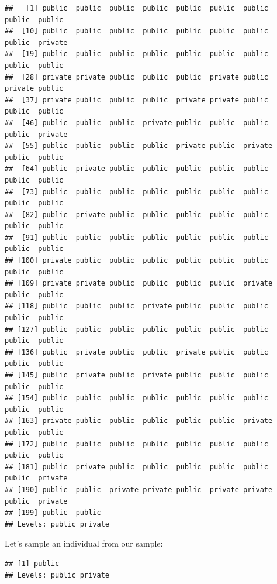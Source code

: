 \documentclass[
]{book}
\newenvironment{Shaded}{\begin{snugshade}}{\end{snugshade}}
\newcommand{\AttributeTok}[1]{\textcolor[rgb]{0.77,0.63,0.00}{#1}}
\newcommand{\DecValTok}[1]{\textcolor[rgb]{0.00,0.00,0.81}{#1}}
\newcommand{\FunctionTok}[1]{\textcolor[rgb]{0.00,0.00,0.00}{#1}}
\newcommand{\NormalTok}[1]{#1}
\newcommand{\SpecialCharTok}[1]{\textcolor[rgb]{0.00,0.00,0.00}{#1}}
\begin{document}
\begin{verbatim}
##   [1] public  public  public  public  public  public  public  public  public 
##  [10] public  public  public  public  public  public  public  public  private
##  [19] public  public  public  public  public  public  public  public  public 
##  [28] private private public  public  public  private public  private public 
##  [37] private public  public  public  private private public  public  public 
##  [46] public  public  public  private public  public  public  public  private
##  [55] public  public  public  public  private public  private public  public 
##  [64] public  private public  public  public  public  public  public  public 
##  [73] public  public  public  public  public  public  public  public  public 
##  [82] public  private public  public  public  public  public  public  public 
##  [91] public  public  public  public  public  public  public  public  public 
## [100] private public  public  public  public  public  public  public  public 
## [109] private private public  public  public  public  private public  public 
## [118] public  public  public  private public  public  public  public  public 
## [127] public  public  public  public  public  public  public  public  public 
## [136] public  private public  public  private public  public  public  public 
## [145] public  private public  private public  public  public  public  public 
## [154] public  public  public  public  public  public  public  public  public 
## [163] private public  public  public  public  public  private public  public 
## [172] public  public  public  public  public  public  public  public  public 
## [181] public  private public  public  public  public  public  public  private
## [190] public  public  private private public  private private public  private
## [199] public  public 
## Levels: public private
\end{verbatim}

Let's sample an individual from our sample:

\begin{Shaded}
\end{Shaded}

\begin{verbatim}
## [1] public
## Levels: public private
\end{verbatim}
\end{document}
